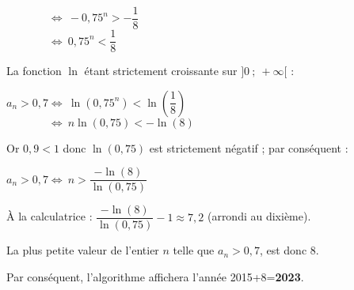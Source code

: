 \begin{corrige}
\begin{enumerate}
     $\phantom{ a_n > 0,7 } \Leftrightarrow \  -0,75^n  > -\dfrac{1}{8}$\\
     $\phantom{ a_n > 0,7 } \Leftrightarrow \  0,75^n < \dfrac{1}{8}$
     \par
     La fonction $\ln$ étant strictement croissante sur $]0~;~+\infty[$ :
     \par
     $a_n > 0,7  \Leftrightarrow \  \ln \left(0,75^n \right) < \ln \left(\dfrac{1}{8}\right) $ \\
     $\phantom{ a_n > 0,7 } \Leftrightarrow \ n\ln (0,75) < -\ln (8)$
     \par
     Or $0,9 < 1$ donc $\ln (0,75)$ est strictement négatif ; par conséquent :
     \par
     $a_n > 0,7 \Leftrightarrow \ n > \dfrac{-\ln (8)}{\ln (0,75)}$
     \par
     \`A la calculatrice : $\dfrac{-\ln (8)}{\ln (0,75)} - 1 \approx 7,2$ (arrondi au dixième).
     \par
     La plus petite valeur de l'entier $n$ telle que $a_n > 0,7$, est donc $8$.
     \par
     Par conséquent, l'algorithme affichera l'année 2015+8=\textbf{2023}.
     \par
\end{enumerate}
\end{corrige}
